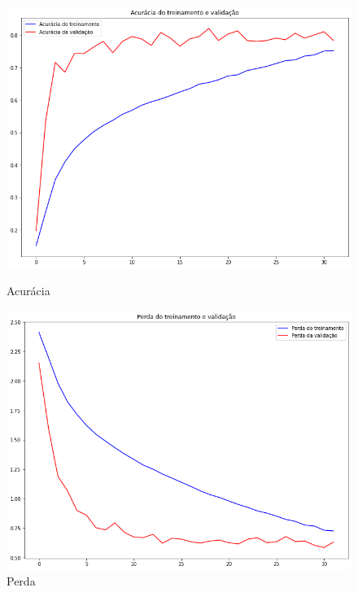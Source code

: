 \documentclass[12pt]{article}
\begin{document}
\begin{figure}[!htb]
  \begin{minipage}{.47\textwidth}
    \centering
    \includegraphics[width=1.1\linewidth]{experiments/default_aug_32/accuracy.png}
    \caption{Acurácia}\label{fig:experiment_default_aug_32_accuracy}
  \end{minipage}\hfill
  \begin{minipage}{.47\textwidth}
    \centering
    \includegraphics[width=1.1\linewidth]{experiments/default_aug_32/loss.png}
    \caption{Perda}\label{fig:experiment_default_aug_32_loss}
  \end{minipage}
\end{figure}
\end{document}
